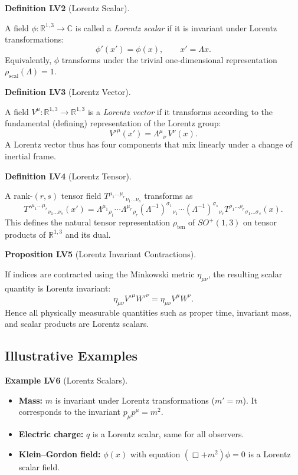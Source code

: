 \documentclass[10pt, letterpaper]{article}
\newcommand{\R}{\mathbb{R}}
\newcommand{\C}{\mathbb{C}}
\newcommand{\CustomHeading}[3]{%
  \par\medskip\noindent%
  \textbf{#1 #2} \textnormal{(#3)}.\enskip%
}
\newenvironment{DEF}[2]{\begin{unitbox}\CustomHeading{Definition}{#1}{#2}}{\end{unitbox}}
\newenvironment{PROP}[2]{\begin{unitbox}\CustomHeading{Proposition}{#1}{#2}}{\end{unitbox}}
\newenvironment{EXA}[2]{\begin{unitbox}\CustomHeading{Example}{#1}{#2}}{\end{unitbox}}
\begin{document}
\begin{DEF}{LV2}{Lorentz Scalar}
A field $\phi:\R^{1,3}\to\C$ is called a \emph{Lorentz scalar} if it is invariant under Lorentz transformations:
\[
\phi'(x') = \phi(x),\qquad x'=\Lambda x.
\]
Equivalently, $\phi$ transforms under the trivial one-dimensional representation
$\rho_{\mathrm{scal}}(\Lambda)=1$.
\end{DEF}

\begin{DEF}{LV3}{Lorentz Vector}
A field $V^\mu:\R^{1,3}\to\R^{1,3}$ is a \emph{Lorentz vector} if it transforms according to the fundamental (defining) representation of the Lorentz group:
\[
V'^\mu(x') = \Lambda^\mu{}_\nu\, V^\nu(x).
\]
A Lorentz vector thus has four components that mix linearly under a change of inertial frame.
\end{DEF}

\begin{DEF}{LV4}{Lorentz Tensor}
A rank-$(r,s)$ tensor field $T^{\mu_1\dots\mu_r}{}_{\nu_1\dots\nu_s}$ transforms as
\[
T'^{\mu_1\dots\mu_r}{}_{\nu_1\dots\nu_s}(x')
 = \Lambda^{\mu_1}{}_{\rho_1}\cdots\Lambda^{\mu_r}{}_{\rho_r}
   (\Lambda^{-1})^{\sigma_1}{}_{\nu_1}\cdots(\Lambda^{-1})^{\sigma_s}{}_{\nu_s}
   T^{\rho_1\dots\rho_r}{}_{\sigma_1\dots\sigma_s}(x).
\]
This defines the natural tensor representation $\rho_{\mathrm{ten}}$ of $SO^+(1,3)$ on tensor products of $\R^{1,3}$ and its dual.
\end{DEF}

\begin{PROP}{LV5}{Lorentz Invariant Contractions}
If indices are contracted using the Minkowski metric $\eta_{\mu\nu}$, the resulting scalar quantity is Lorentz invariant:
\[
\eta_{\mu\nu}V'^\mu W'^\nu = \eta_{\mu\nu}V^\mu W^\nu.
\]
Hence all physically measurable quantities such as proper time, invariant mass, and scalar products are Lorentz scalars.
\end{PROP}

\subsection{Illustrative Examples}

\begin{EXA}{LV6}{Lorentz Scalars}
\begin{itemize}
\item \textbf{Mass:} $m$ is invariant under Lorentz transformations ($m'=m$).  
  It corresponds to the invariant $p_\mu p^\mu = m^2$.
\item \textbf{Electric charge:} $q$ is a Lorentz scalar, same for all observers.
\item \textbf{Klein–Gordon field:} $\phi(x)$ with equation $(\Box+m^2)\phi=0$ is a Lorentz scalar field.
\end{itemize}
\end{EXA}
\end{document}
